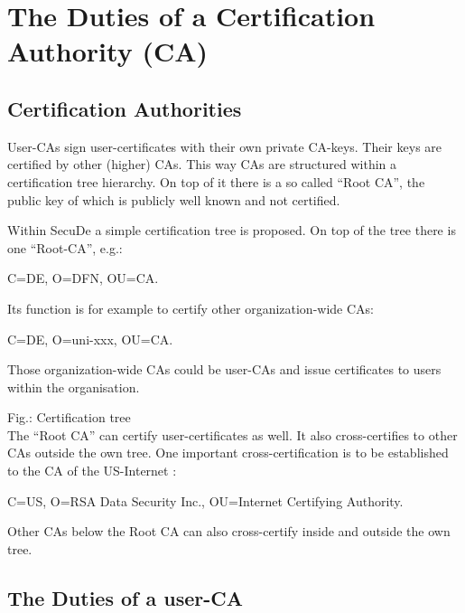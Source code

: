 \section{The Duties of a Certification Authority (CA)}
\thispagestyle{myheadings}
\label{ca}

\subsection{Certification Authorities}
\label{ca-dfn}

User-CAs sign user-certificates with their own private CA-keys.
Their keys are certified by other (higher) CAs.
This way CAs are structured within a certification tree hierarchy.
On top of it there is a so called ``Root CA'', the public key of which
is publicly well known and not certified.

Within SecuDe
a simple certification tree is proposed.
On top of the tree there is one ``Root-CA'', e.g.:
\begin{center}
C=DE, O=DFN, OU=CA.
\end{center}
Its function is for example to certify other organization-wide CAs:
\begin{center}
C=DE, O=uni-xxx, OU=CA.
\end{center}
Those organization-wide CAs could be user-CAs and issue certificates
to users within the organisation.

\begin{center}
\end{center}
\label{fig-ca-dfn}
{\footnotesize Fig.: Certification tree}
\\ [1em]

The ``Root CA'' can certify user-certificates as well.
It also cross-certifies to other CAs outside the own tree.
One important cross-certification is to be established to the CA of the
US-Internet
\cite{rfc1}:
\begin{center}
C=US, O=RSA Data Security Inc., OU=Internet Certifying Authority.
\end{center}
Other CAs below the Root CA can also cross-certify
inside and outside the own tree.

\subsection{The Duties of a user-CA}
\label{ca-uca}

